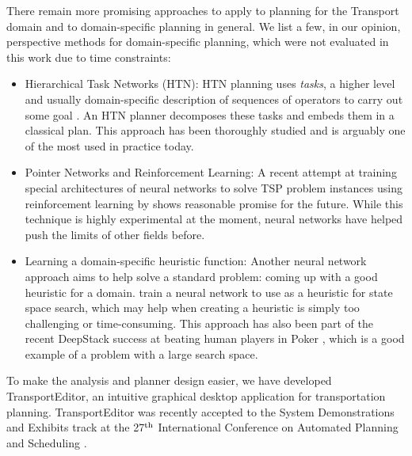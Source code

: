 There remain more promising approaches to apply to planning
for the Transport domain
and to domain-specific planning in general.
We list a few, in our opinion, perspective methods for domain-specific planning, which were not
evaluated in this work due to time constraints:
\begin{itemize}
\item Hierarchical Task Networks (HTN): 
HTN planning uses \textit{tasks},
a higher level and usually domain-specific description of sequences of operators
to carry out some goal \citep[Chapter~11]{Ghallab2004}.
An HTN planner decomposes these tasks and embeds them in a classical plan. This approach has been thoroughly studied and is arguably one of the most used in practice today.

\item Pointer Networks and Reinforcement Learning: 
A recent attempt at training special architectures of neural networks to solve TSP problem instances using reinforcement learning by \citet{Bello2016} shows
reasonable promise for the future. While this technique is highly experimental at the moment,
neural networks have helped push the limits of other fields before.

\item Learning a domain-specific heuristic function: Another neural network
approach aims to help solve a standard problem: coming up with a good heuristic for a domain. \citet{Chen2011}
train a neural network to use as a heuristic for state space search,
which may help when creating a heuristic is simply too challenging or time-consuming.
This approach has also been part of the recent DeepStack success at
beating human players in Poker \citep{Moravcik2017}, which is a good example of a problem with a large search space.
\end{itemize}

To make the analysis and planner design easier, we have developed TransportEditor,
an intuitive graphical desktop application for transportation planning.
TransportEditor was recently accepted to the System Demonstrations and Exhibits
track at the 27$^{\textrm{th}}$ International Conference on Automated Planning and Scheduling \citep{Skopek2017}. 